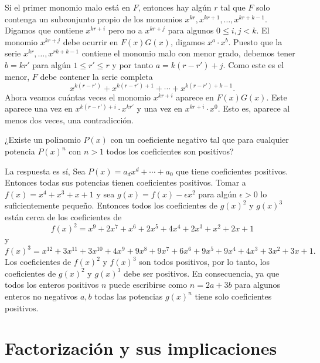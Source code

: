 \begin{solution}
    Si el primer monomio malo está en $F$, entonces hay algún $r$ tal que $F$ solo contenga un subconjunto propio de los monomios $x^{kr}, x^{kr + 1}, \ldots, x^{kr + k - 1}$.
    Digamos que contiene $x^{kr + i}$ pero no a $x^{kr + j}$ para algunos $0 \leq i, j < k$.
    El monomio $x^{kr + j}$ debe ocurrir en $F(x) G(x)$, digamos $x^a \cdot x^b$.
    Puesto que la serie $x^{kr}, \ldots, x^{rk + k - 1}$ contiene el monomio malo con menor grado, debemos tener $b = kr'$ para algún $1 \leq r' \leq r$ y por tanto $a = k(r - r') + j$.
    Como este es el menor, $F$ debe contener la serie completa
    \[
        x^{k(r - r')} + x^{k(r - r') + 1} + \cdots + x^{k(r - r') + k - 1}.
    \]
    Ahora veamos cuántas veces el monomio $x^{kr + i}$ aparece en $F(x) G(x)$.
    Este aparece una vez en $x^{k(r - r') + i} \cdot x^{kr'}$ y una vez en $x^{kr + i}\cdot x^0$.
    Esto es, aparece al menos dos veces, una contradicción.
\end{solution}

\begin{example}
    ¿Existe un polinomio $P(x)$ con un coeficiente negativo tal que para cualquier potencia $P(x)^n$ con $n > 1$ todos los coeficientes son positivos?
\end{example}
\begin{solution}
    La respuesta es sí,
    Sea $P(x) = a_d x^d + \cdots + a_0$ que tiene coeficientes positivos.
    Entonces todas sus potencias tienen coeficientes positivos.
    Tomar a $f(x) = x^4 + x^3 + x + 1$ y sea $g(x) = f(x) - \epsilon x^2$ para algún $\epsilon > 0$ lo suficientemente pequeño.
    Entonces todos los coeficientes de $g(x)^2$ y $g(x)^3$ están cerca de los coeficientes de
    \[
        f(x)^2 = x^9 + 2x^7 + x^6 + 2x^5 + 4x^4 + 2x^3 + x^2 + 2x + 1
    \]
    y
    \[
        f(x)^3 = x^{12} + 3x^{11} + 3x^{10} + 4x^9 + 9x^8 + 9x^7 + 6x^6 + 9x^5 + 9x^4 + 4x^3 + 3x^2 + 3x + 1.
    \]
    Los coeficientes de $f(x)^2$ y $f(x)^3$ son todos positivos, por lo tanto, los coeficientes de $g(x)^2$ y $g(x)^3$ debe ser positivos.
    En consecuencia, ya que todos los enteros positivos $n$ puede escribirse como $n = 2a + 3b$ para algunos enteros no negativos $a, b$ todas las potencias $g(x)^n$ tiene solo coeficientes positivos.
\end{solution}



\section{Factorización y sus implicaciones}

